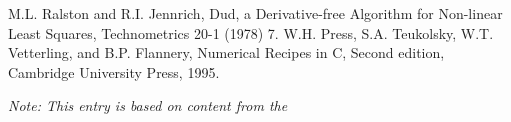 \documentclass{article}
\begin{document}
\begin{thebibliography}{9}
 M.L. Ralston and R.I. Jennrich, Dud, a Derivative-free Algorithm for Non-linear Least Squares, Technometrics 20-1 (1978) 7.
 W.H. Press, S.A. Teukolsky, W.T. Vetterling, and B.P. Flannery, Numerical Recipes in C, Second edition, Cambridge University Press, 1995.
\end{thebibliography}

{\it Note: This entry is based on content from the }
\end{document}
